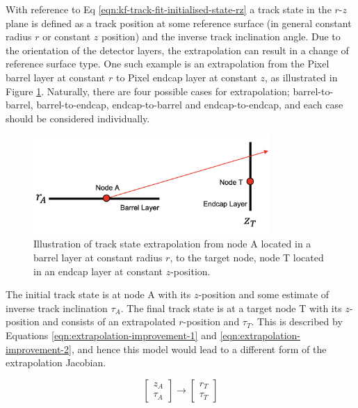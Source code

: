 With reference to Eq \ref{eqn:kf-track-fit-initialised-state-rz} a track state in the $r$-$z$ plane is defined as a track position at some reference surface (in general constant radius $r$ or constant $z$ position) and the inverse track inclination angle. Due to the orientation of the detector layers, the extrapolation can result in a change of reference surface type. One such example is an extrapolation from the Pixel barrel layer at constant $r$ to Pixel endcap layer at constant $z$, as illustrated in Figure \ref{fig:improvement-extrapolation}. Naturally, there are four possible cases for extrapolation; barrel-to-barrel, barrel-to-endcap, endcap-to-barrel and endcap-to-endcap, and each case should be considered individually.


\begin{figure}[htbp]
    \centering
    \includegraphics[width=0.8\textwidth]{images/7-results/improvement-extrapolation.png}
    \caption{Illustration of track state extrapolation from node A located in a barrel layer at constant radius $r$, to the target node, node T located in an endcap layer at constant $z$-position.}
    \label{fig:improvement-extrapolation}%
\end{figure}


The initial track state is at node A with its $z$-position and some estimate of inverse track inclination $\tau_A$. The final track state is at a target node T with its $z$-position and consists of an extrapolated $r$-position and $\tau_T$. This is described by Equations \eqref{eqn:extrapolation-improvement-1}  and \eqref{eqn:extrapolation-improvement-2}, and hence this model would lead to a different form of the extrapolation Jacobian.

\begin{equation}
    \begin{bmatrix} z_A \\ \tau_A \end{bmatrix} 
    \rightarrow
    \begin{bmatrix} r_T \\ \tau_T \end{bmatrix} 
    \label{eqn:extrapolation-improvement-1}
\end{equation}

